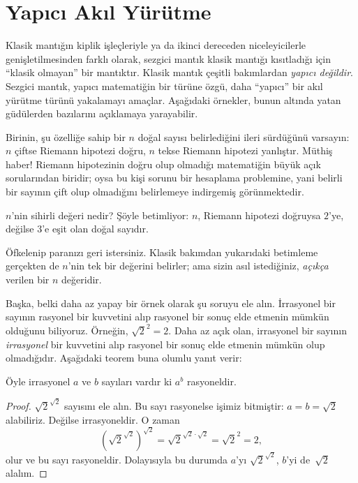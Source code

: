 


\section{Yapıcı Akıl Yürütme}

Klasik mantığın kiplik işleçleriyle ya da ikinci dereceden niceleyicilerle
genişletilmesinden farklı olarak, sezgici mantık klasik mantığı kısıtladığı için
``klasik olmayan'' bir mantıktır. Klasik mantık çeşitli bakımlardan
\emph{yapıcı değildir}. Sezgici mantık, yapıcı matematiğin bir türüne özgü,
daha ``yapıcı'' bir akıl yürütme türünü yakalamayı amaçlar. Aşağıdaki örnekler,
bunun altında yatan güdülerden bazılarını açıklamaya yarayabilir.

Birinin, şu özelliğe sahip bir $n$ doğal sayısı belirlediğini ileri sürdüğünü
varsayın: $n$ çiftse Riemann hipotezi doğru, $n$ tekse Riemann hipotezi
yanlıştır. Müthiş haber!{} Riemann hipotezinin doğru olup olmadığı matematiğin
büyük açık sorularından biridir; oysa bu kişi sorunu bir hesaplama problemine,
yani belirli bir sayının çift olup olmadığını belirlemeye indirgemiş
görünmektedir.

$n$'nin sihirli değeri nedir? Şöyle betimliyor: $n$, Riemann hipotezi doğruysa
$2$'ye, değilse $3$'e eşit olan doğal sayıdır.

Öfkelenip paranızı geri istersiniz. Klasik bakımdan yukarıdaki betimleme
gerçekten de $n$'nin tek bir değerini belirler; ama sizin asıl istediğiniz,
\emph{açıkça} verilen bir $n$ değeridir.

Başka, belki daha az yapay bir örnek olarak şu soruyu ele alın. İrrasyonel bir
sayının rasyonel bir kuvvetini alıp rasyonel bir sonuç elde etmenin mümkün
olduğunu biliyoruz. Örneğin, $\sqrt{2}^2 = 2$. Daha az açık olan, irrasyonel bir
sayının \emph{irrasyonel} bir kuvvetini alıp rasyonel bir sonuç elde etmenin
mümkün olup olmadığıdır. Aşağıdaki teorem buna olumlu yanıt verir:

\begin{thm}
Öyle irrasyonel $a$ ve $b$ sayıları vardır ki $a^b$ rasyoneldir.
\end{thm}

\begin{proof}
$\sqrt{2}^{\sqrt{2}}$ sayısını ele alın. Bu sayı rasyonelse işimiz bitmiştir:
$a = b = \sqrt{2}$ alabiliriz. Değilse irrasyoneldir. O zaman
\[
(\sqrt{2}^{\sqrt{2}})^{\sqrt{2}} = \sqrt{2}^{\sqrt{2} \cdot
  \sqrt{2}} = \sqrt{2}^2 = 2,
\]
olur ve bu sayı rasyoneldir. Dolayısıyla bu durumda $a$'yı
$\sqrt{2}^{\sqrt{2}}$, $b$'yi de~$\sqrt 2$ alalım.
\end{proof}

